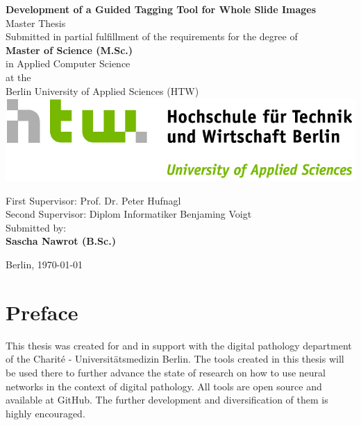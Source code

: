 \documentclass{report}
\begin{document}
\begin{titlepage}
	\centering
	{\huge\textbf{Development of a Guided Tagging Tool for Whole Slide Images\\}}
	\vspace{1cm}
	{\huge Master Thesis\\}
	\vspace{2cm}
	{\large Submitted in partial fulfillment of the requirements for the degree
	of\\}
	\vspace{0.5cm}
	{\large \textbf{Master of Science (M.Sc.)}\\ 
	in Applied Computer Science\\}
	\vspace{0.5cm}
	{\large at the\\}
	\vspace{0.5cm}
	{\large Berlin University of Applied Sciences (HTW)\\}
	\vspace{0.5cm}
	\includegraphics[scale=1]{img/HTW_Logo_quer_rgb.jpg}
	\\
	\vspace{1cm}
	\raggedright
	{\large First Supervisor: Prof. Dr. Peter Hufnagl\\}
	\vspace{0.25cm}
	{\large Second Supervisor: Diplom Informatiker Benjaming Voigt\\}
	\centering
	\vspace{1.5cm}
	{\large Submitted by: \\}
	\vspace{0.25cm}
	{\large \textbf{Sascha Nawrot (B.Sc.)}}
	\vfill
		{\large Berlin, \today{}\par}
\end{titlepage}

\newpage
\chapter*{Preface}
This thesis was created for and in support with the digital pathology department of the Charité - Universitätsmedizin Berlin. The tools created in this thesis will be used there to further advance the state of research on how to use neural networks in the context of digital pathology. All tools are open source and available at GitHub. The further development and diversification of them is highly encouraged.
\end{document}
